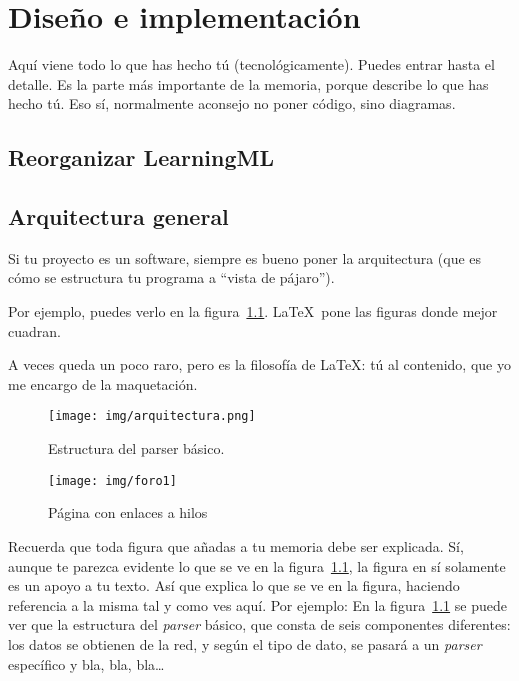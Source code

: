 \documentclass[a4paper, 12pt]{book}
\begin{document}

\cleardoublepage
\chapter{Diseño e implementación}

Aquí viene todo lo que has hecho tú (tecnológicamente). 
Puedes entrar hasta el detalle. 
Es la parte más importante de la memoria, porque describe lo que has hecho tú.
Eso sí, normalmente aconsejo no poner código, sino diagramas.

\section{Reorganizar LearningML} 
\label{sec:reorganizar}

\section{Arquitectura general} 
\label{sec:arquitectura}

Si tu proyecto es un software, siempre es bueno poner la arquitectura (que es cómo se estructura tu programa a ``vista de pájaro'').

Por ejemplo, puedes verlo en la figura~\ref{fig:arquitectura}.
\LaTeX \ pone las figuras donde mejor cuadran. 

A veces queda un poco raro, pero es la filosofía de \LaTeX: tú al contenido, que yo me encargo de la maquetación.

\begin{figure}
  \centering
  \texttt{[image: img/arquitectura.png]}
  \caption{Estructura del parser básico.}\label{fig:arquitectura}
\end{figure}

\begin{figure}
    \centering
    \texttt{[image: img/foro1]}
    \caption{Página con enlaces a hilos}\label{fig:_arquitectura}
\end{figure}

 
Recuerda que toda figura que añadas a tu memoria debe ser explicada.
Sí, aunque te parezca evidente lo que se ve en la figura~\ref{fig:arquitectura}, la figura en sí solamente es un apoyo a tu texto.
Así que explica lo que se ve en la figura, haciendo referencia a la misma tal y como ves aquí.
Por ejemplo: En la figura~\ref{fig:arquitectura} se puede ver que la estructura del \emph{parser} básico, que consta de seis componentes diferentes: los datos se obtienen de la red, y según el tipo de dato, se pasará a un \emph{parser} específico y bla, bla, bla\ldots
\end{document}
